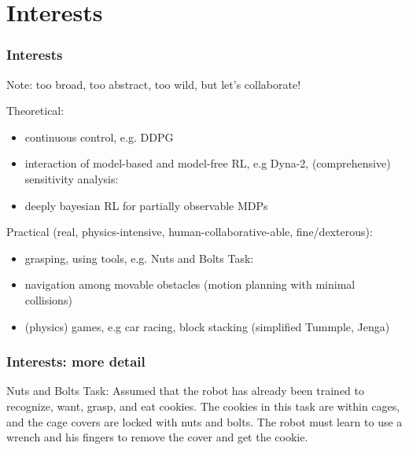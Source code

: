 \section{Interests}

\begin{frame}
\frametitle{Interests}
Note: too broad, too abstract, too wild,
but let's collaborate!

Theoretical:
\begin{itemize}
  \item continuous control,
  e.g. DDPG
  \item interaction of model-based and model-free RL,
  e.g Dyna-2, (comprehensive) sensitivity analysis:
  \item deeply bayesian RL for partially observable MDPs
\end{itemize}

Practical (real, physics-intensive, human-collaborative-able, fine/dexterous):
\begin{itemize}
  \item grasping, using tools,
  e.g.  Nuts and Bolts Task:
  \item navigation among movable obstacles
  (motion planning with minimal collisions)
  \item (physics) games, e.g
  car racing, block stacking (simplified Tummple, Jenga)
\end{itemize}
\end{frame}

\begin{frame}
\frametitle{Interests: more detail}
Nuts and Bolts Task:
Assumed that the robot has already been trained to recognize, want, grasp, and eat cookies.
The cookies in this task are within cages, and the cage covers are locked with nuts and bolts.
The robot must learn to use a wrench and his fingers to remove the cover and get the cookie.
\end{frame}

